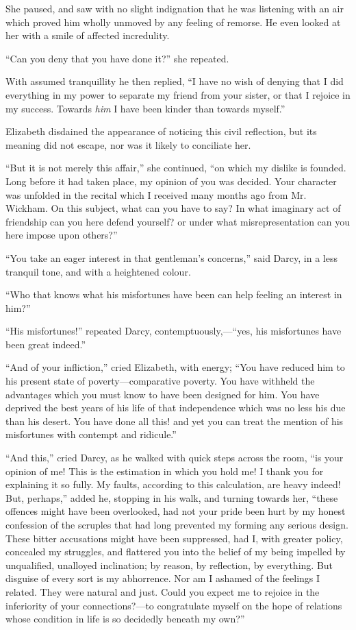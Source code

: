 \documentclass[12pt,openright]{book}
\begin{document}
She paused, and saw with no slight indignation that he was listening with an air which proved him wholly unmoved by any feeling of remorse. He even looked at her with a smile of affected incredulity.

“Can you deny that you have done it?” she repeated.

With assumed tranquillity he then replied, “I have no wish of denying that I did everything in my power to separate my friend from your sister, or that I rejoice in my success. Towards \textit{him} I have been kinder than towards myself.”

Elizabeth disdained the appearance of noticing this civil reflection, but its meaning did not escape, nor was it likely to conciliate her.

“But it is not merely this affair,” she continued, “on which my dislike is founded. Long before it had taken place, my opinion of you was decided. Your character was unfolded in the recital which I received many months ago from Mr. Wickham. On this subject, what can you have to say? In what imaginary act of friendship can you here defend yourself? or under what misrepresentation can you here impose upon others?”

“You take an eager interest in that gentleman’s concerns,” said Darcy, in a less tranquil tone, and with a heightened colour.

“Who that knows what his misfortunes have been can help feeling an interest in him?”

“His misfortunes!” repeated Darcy, contemptuously,—“yes, his misfortunes have been great indeed.”

“And of your infliction,” cried Elizabeth, with energy; “You have reduced him to his present state of poverty—comparative poverty. You have withheld the advantages which you must know to have been designed for him. You have deprived the best years of his life of that independence which was no less his due than his desert. You have done all this! and yet you can treat the mention of his misfortunes with contempt and ridicule.”

“And this,” cried Darcy, as he walked with quick steps across the room, “is your opinion of me! This is the estimation in which you hold me! I thank you for explaining it so fully. My faults, according to this calculation, are heavy indeed! But, perhaps,” added he, stopping in his walk, and turning towards her, “these offences might have been overlooked, had not your pride been hurt by my honest confession of the scruples that had long prevented my forming any serious design. These bitter accusations might have been suppressed, had I, with greater policy, concealed my struggles, and flattered you into the belief of my being impelled by unqualified, unalloyed inclination; by reason, by reflection, by everything. But disguise of every sort is my abhorrence. Nor am I ashamed of the feelings I related. They were natural and just. Could you expect me to rejoice in the inferiority of your connections?—to congratulate myself on the hope of relations whose condition in life is so decidedly beneath my own?”
\end{document}
